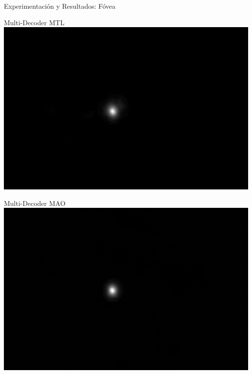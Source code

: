\documentclass[xcolor=dvipsnames,table]{beamer}
\begin{document}
\begin{frame}{Experimentación y Resultados: Fóvea}
\begin{minipage}[b]{0.13\textwidth}
	\end{minipage}\hfill
	\begin{minipage}[b]{0.13\textwidth}
		\centering
		Multi-Decoder MTL\\[0.2cm]
		\includegraphics[width=\linewidth]{my_images/video/FOVEAMULTIMTL.jpg}
	\end{minipage}\hfill
	\begin{minipage}[b]{0.13\textwidth}
		\centering
		Multi-Decoder MAO\\[0.2cm]
		\includegraphics[width=\linewidth]{my_images/video/FOVEAMULTIMAO.jpg}
	\end{minipage}
\end{frame}
\end{document}
